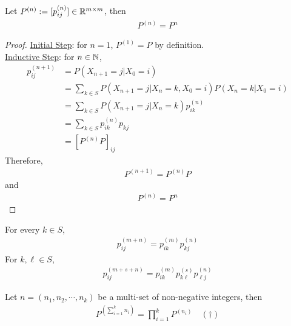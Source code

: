 \documentclass{article}
\begin{document}
    \begin{proposition}
    Let $P^{(n)} := [p_{ij}^{(n)}] \in \mathbb{R}^{m \times m}$, then
    	\begin{align}
    		P^{(n)} = P^n
    	\end{align}
    \end{proposition}
    \begin{proof}
    	\ul{Initial Step}: for $n = 1$, $P^{(1)} = P$ by definition. \\
    	\ul{Inductive Step}: for $n \in \mathbb{N}$,
    	\begin{align}
    		p_{ij}^{(n+1)} &= P(X_{n+1}=j|X_0=i) \\
    		&= \sum_{k \in S} P(X_{n+1}=j|X_n = k, X_0=i) P(X_n=k|X_0=i) \\
    		&= \sum_{k \in S} P(X_{n+1}=j|X_n = k) p_{ik}^{(n)} \\
    		&= \sum_{k \in S} p_{ik}^{(n)} p_{kj} \\
    		&= [P^{(n)} P]_{ij}
    	\end{align}
    	Therefore,
    	\begin{align}
    		P^{(n+1)} = P^{(n)} P
    	\end{align}
    	and 
    	\begin{align}
    		P^{(n)} = P^n
    	\end{align}
    \end{proof}

    \begin{theorem}
    	For every $k \in S$,
    	\begin{align}
    		p_{ij}^{(m+n)} = p_{ik}^{(m)} p_{kj}^{(n)}
    	\end{align}
    	For $k,\ell \in S$,
    	\begin{align}
    		p_{ij}^{(m+s+n)} = p_{ik}^{(m)} p_{k\ell}^{(s)} p_{\ell j}^{(n)}
    	\end{align}
    \end{theorem}

    \begin{theorem}
    	Let $n = (n_1, n_2, \cdots, n_k)$ be a multi-set of non-negative integers, then
    	\begin{align}
    		P^{(\sum_{i=1}^k n_i)} = \prod_{i=1}^k P^{(n_i)}\quad (\dagger)
    	\end{align}
    \end{theorem}
    
\end{document}
